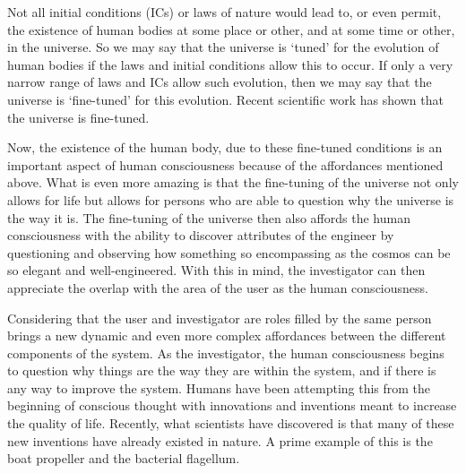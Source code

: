 \begin{quoting}
Not all initial conditions (ICs) or laws of nature
would lead to, or even permit, the existence of human bodies at some
place or other, and at some time or other, in the universe. So we may
say that the universe is `tuned' for the evolution of human bodies if
the laws and initial conditions allow this to occur. If only a very
narrow range of laws and ICs allow such evolution, then we may say that
the universe is `fine-tuned' for this evolution. Recent scientific work
has shown that the universe is fine-tuned. \citep[][p.~172]{swinburne2004}
\end{quoting}

Now, the existence of the human body, due to these fine-tuned conditions
is an important aspect of human consciousness because of the
affordances mentioned above. What is even more amazing is that the fine-tuning 
of the universe not only allows for life but allows for persons
who are able to question why the universe is the way it is. The
fine-tuning of the universe then also affords the human consciousness
with the ability to discover attributes of the engineer by questioning
and observing how something so encompassing as the cosmos can be so
elegant and well-engineered. With this in mind, the investigator can
then appreciate the overlap with the area of the user as the human
consciousness.

Considering that the user and investigator are roles filled by the same
person brings a new dynamic and even more complex affordances between
the different components of the system. As the investigator, the human
consciousness begins to question why things are the way they are within
the system, and if there is any way to improve the system. Humans have
been attempting this from the beginning of conscious thought with
innovations and inventions meant to increase the quality of life.
Recently, what scientists have discovered is that many of these new
inventions have already existed in nature. A prime example of this is
the boat propeller and the bacterial flagellum. 

